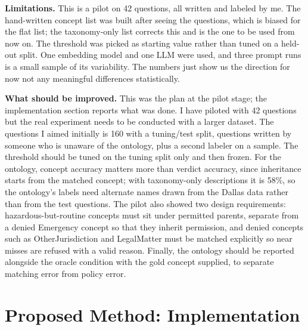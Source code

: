 \documentclass[conference]{IEEEtran}
\begin{document}
\textbf{Limitations.} This is a pilot on 42 questions, all written and labeled by me. The hand-written concept list was built after seeing the questions, which is biased for the flat list; the taxonomy-only list corrects this and is the one to be used from now on. The threshold was picked as starting value rather than tuned on a held-out split. One embedding model and one LLM were used, and three prompt runs is a small sample of its variability. The numbers just show us the direction for now not any meaningful differences statistically.

\textbf{What should be improved.} This was the plan at the pilot stage; the implementation section reports what was done. I have piloted with 42 questions but the real experiment needs to be conducted with a larger dataset. The questions I aimed initially is 160 with a tuning/test split, questions written by someone who is unaware of the ontology, plus a second labeler on a sample. The threshold should be tuned on the tuning split only and then frozen. For the ontology, concept accuracy matters more than verdict accuracy, since inheritance starts from the matched concept; with taxonomy-only descriptions it is 58\%, so the ontology's labels need alternate names drawn from the Dallas data rather than from the test questions. The pilot also showed two design requirements: hazardous-but-routine concepts must sit under permitted parents, separate from a denied Emergency concept so that they inherit permission, and denied concepts such as OtherJurisdiction and LegalMatter must be matched explicitly so near misses are refused with a valid reason. Finally, the ontology should be reported alongside the oracle condition with the gold concept supplied, to separate matching error from policy error.

\section{Proposed Method: Implementation}
\end{document}
